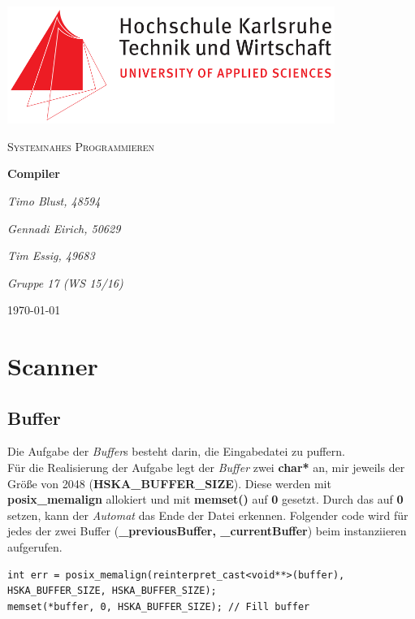 \documentclass[
a4paper
]{scrreprt}
\begin{document}
	\sffamily %
	
	
	\begin{titlepage}
		\centering
		\includegraphics[width=0.8\textwidth]{./images/logo_hska.png}\par\vspace{1cm}
		\vspace{1cm}
		
		{\scshape\Large Systemnahes Programmieren\par}
		\vspace{1.5cm}
		
		{\huge\textbf{Compiler}\par}
		\vspace{2cm}
		
		{\Large\itshape Timo Blust, 48594\par}
		{\Large\itshape Gennadi Eirich, 50629\par}
		{\Large\itshape Tim Essig, 49683\par\par}
		\vspace{2cm}
		
		{\Large\itshape Gruppe 17 (WS 15/16)\par}
		
		\vfill
		
		{\large \today\par}
	\end{titlepage}
	
	
	\tableofcontents
	
	\chapter{Scanner}
	\section{Buffer}
	Die Aufgabe der \textit{Buffer}s besteht darin, die Eingabedatei zu puffern.\\
	
	Für die Realisierung der Aufgabe legt der \textit{Buffer} zwei \textbf{char*} an, mir jeweils der Größe von 2048 (\textbf{HSKA\_BUFFER\_SIZE}). 
	Diese werden mit \textbf{posix\_memalign} allokiert und mit \textbf{memset()} auf \textbf{0} gesetzt. Durch das auf \textbf{0} setzen, kann der \textit{Automat} das Ende der Datei erkennen. Folgender code wird für jedes der zwei Buffer (\textbf{\_previousBuffer, \_currentBuffer}) beim instanziieren aufgerufen.
	\begin{lstlisting}
int err = posix_memalign(reinterpret_cast<void**>(buffer), 
HSKA_BUFFER_SIZE, HSKA_BUFFER_SIZE);
memset(*buffer, 0, HSKA_BUFFER_SIZE); // Fill buffer
	\end{lstlisting}
	
\end{document}
